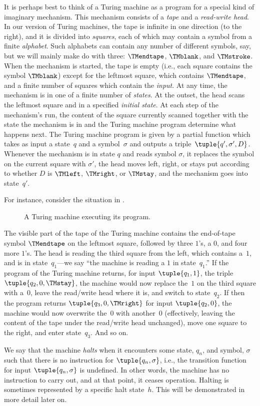 \documentclass[../../../include/open-logic-section]{subfiles}
\begin{document}
\begin{explain}
It is perhaps best to think of a Turing
machine as a program for a special kind of imaginary mechanism. This
mechanism consists of a \emph{tape} and a \emph{read-write head}. In
our version of Turing machines, the tape is infinite in one direction
(to the right), and it is divided into \emph{squares}, each of which
may contain a symbol from a finite \emph{alphabet}. Such alphabets can
contain any number of different symbols, say, but we will mainly make do
with three: $\TMendtape$, $\TMblank$, and $\TMstroke$. When the
mechanism is started, the tape is empty (i.e., each square contains
the symbol $\TMblank$) except for the leftmost square, which contains
$\TMendtape$, and a finite number of squares which contain the
\emph{input}. At any time, the mechanism is in one of a finite number
of \emph{states}. At the outset, the head scans the leftmost square
and in a specified \emph{initial state}. At each step of the
mechanism's run, the content of the square currently scanned together
with the state the mechanism is in and the Turing machine program
determine what happens next. The Turing machine program is given by a
partial function which takes as input a state~$q$ and a
symbol~$\sigma$ and outputs a triple~$\tuple{q', \sigma',
  D}$. Whenever the mechanism is in state $q$ and reads symbol
$\sigma$, it replaces the symbol on the current square with $\sigma'$,
the head moves left, right, or stays put according to whether $D$ is
$\TMleft$, $\TMright$, or $\TMstay$, and the mechanism goes into
state~$q'$.

For instance, consider the situation in .
\begin{figure}
  \caption{A Turing machine executing its program.}
\end{figure}
The visible part of the tape of the Turing machine contains the
end-of-tape symbol $\TMendtape$ on the leftmost square, followed by
three $1$'s, a $0$, and four more $1$'s.  The
head is reading the third square from the left, which contains
a~$1$, and is in state~$q_1$---we say ``the machine is reading
a $1$ in state~$q_1$.'' If the program of the Turing machine
returns, for input $\tuple{q_1, 1}$, the triple $\tuple{q_2,
0, \TMstay}$, the machine would now replace the~$1$ on
the third square with a~$0$, leave the read/write head where it
is, and switch to state~$q_2$.  If then the program returns
$\tuple{q_3, 0, \TMright}$ for input $\tuple{q_2, 0}$,
the machine would now overwrite the~$0$ with another~$0$
(effectively, leaving the content of the tape under the read/write
head unchanged), move one square to the right, and enter state~$q_3$.
And so on.

We say that the machine \emph{halts} when it encounters some state,
$q_n$, and symbol, $\sigma$ such that there is no instruction for
$\tuple{q_n, \sigma}$, i.e., the transition function for input
$\tuple{q_n,\sigma}$ is undefined. In other words, the machine has no
instruction to carry out, and at that point, it ceases
operation. Halting is sometimes represented by a specific halt
state~$h$.  This will be demonstrated in more detail later on.
\end{explain}
\end{document}
